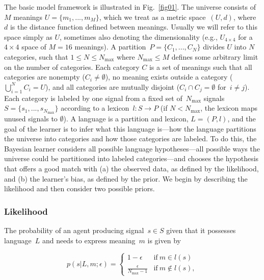 \documentclass[doc,biblatex]{apa7}
\begin{document}
The basic model framework is illustrated in Fig.~\ref{fig01}. The universe consists of $M$ meanings $U = \{m_1, ..., m_M\}$, which we treat as a metric space~$(U, d)$, where $d$ is the distance function defined between meanings. Usually we will refer to this space simply as $U$, sometimes also denoting the dimensionality (e.g., $U_{4 \times 4}$ for a $4 \times 4$ space of $M = 16$ meanings). A partition~$P = \{C_1, ..., C_N\}$ divides $U$ into $N$ categories, such that $1 \leq N \leq N_\mathrm{max}$ where $N_\mathrm{max} \leq M$ defines some arbitrary limit on the number of categories. Each category $C$ is a set of meanings such that all categories are nonempty ($C_i \neq \emptyset$), no meaning exists outside a category ($\bigcup_{i=1}^{N} C_i = U$), and all categories are mutually disjoint ($C_i \cap C_j = \emptyset$ for~$i\neq j$). Each category is labeled by one signal from a fixed set of~$N_\mathrm{max}$ signals~$S = \{s_1, ..., s_{N_\mathrm{max}}\}$ according to a lexicon~$l : S \rightarrow P$ (if $N < N_\mathrm{max}$, the lexicon maps unused signals to $\emptyset$). A language is a partition and lexicon, $L = (P, l)$, and the goal of the learner is to infer what this language is---how the language partitions the universe into categories and how those categories are labeled. To do this, the Bayesian learner considers all possible language hypotheses---all possible ways the universe could be partitioned into labeled categories---and chooses the hypothesis that offers a good match with (a) the observed data, as defined by the likelihood, and (b) the learner's bias, as defined by the prior. We begin by describing the likelihood and then consider two possible priors.

\subsubsection{Likelihood}

The probability of an agent producing signal~$s \in S$ given that it possesses language~$L$ and needs to express meaning~$m$ is given by

	\begin{equation}
	p(s|L,m; \epsilon) =
		\begin{cases}
		  1 - \epsilon                        & \mathrm{if} ~ m \in l(s) \\
		  \frac{\epsilon}{N_\mathrm{max} - 1} & \mathrm{if} ~ m \notin l(s) ,
		\end{cases}
	\label{production}
	\end{equation}
\end{document}
